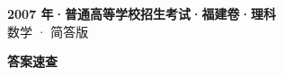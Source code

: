 \documentclass[zihao=-4, a4paper]{ctexart}
\begin{document}
\begin{center}
  {\Large\bfseries 2007 年·普通高等学校招生考试·福建卷·理科}\\[4pt]
  {\large 数学 · 简答版}
\end{center}
\medskip
{}

\clearpage
{}
\begin{center}{\Large\bfseries 答案速查}\end{center}
\medskip

\end{document}
